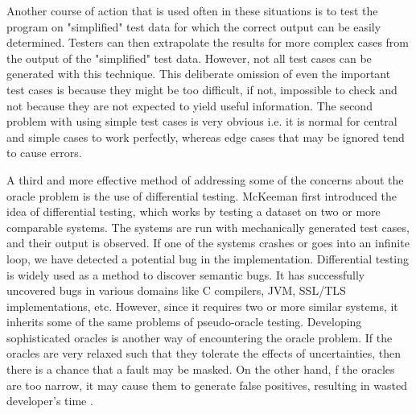 Another course of action that is used often in these situations is to test the program on "simplified" test data for which the correct output can be easily determined. Testers can then extrapolate the results for more complex cases from the output of the "simplified" test data. However, not all test cases can be generated with this technique. This deliberate omission of even the important test cases is because they might be too difficult, if not, impossible to check and not because they are not expected to yield useful information. The second problem with using simple test cases is very obvious i.e. it is normal for central and simple cases to work perfectly, whereas edge cases that may be ignored tend to cause errors. \cite{Weyuker}

 
 A third and more effective method of addressing some of the concerns about the oracle problem is the use of differential testing. McKeeman \cite{McKeeman98differentialtesting} first introduced the idea of differential testing, which works by testing a dataset on two or more comparable systems. The systems are run with mechanically generated test cases, and their output is observed. If one of the systems crashes or goes into an infinite loop, we have detected a potential bug in the implementation. Differential testing is widely used as a method to discover semantic bugs. It has successfully uncovered bugs in various domains like C compilers, JVM, SSL/TLS implementations, etc. However, since it requires two or more similar systems, it inherits some of the same problems of pseudo-oracle testing. Developing sophisticated oracles is another way of encountering the oracle problem. If the oracles are very relaxed such that they tolerate the effects of uncertainties, then there is a chance that a fault may be masked. On the other hand, f the oracles are too narrow, it may cause them to generate false positives, resulting in wasted developer's time \cite{Elbaum2014}.